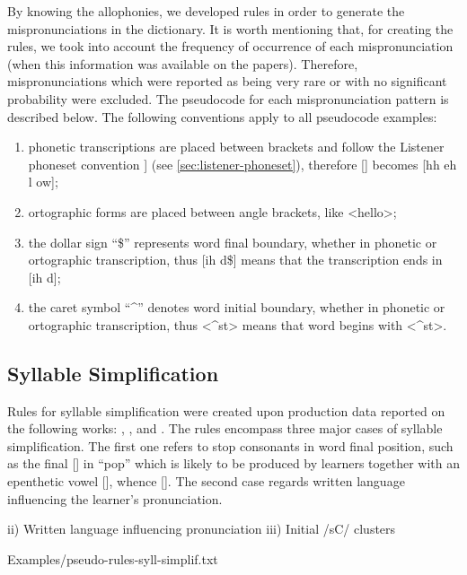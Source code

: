 By knowing the allophonies, we developed rules in order to generate the mispronunciations in the dictionary. It is worth mentioning that,
for creating the rules, we took into account the frequency of occurrence of each mispronunciation (when this information was available 
on the papers). Therefore, mispronunciations which were reported as being very rare or with no significant probability were excluded.
The pseudocode for each mispronunciation pattern is described below. The following conventions apply to all pseudocode examples:

\begin{enumerate}
 \item phonetic transcriptions are placed between brackets and follow the Listener phoneset convention ]
 (see \autoref{sec:listener-phoneset}), therefore [] becomes [hh eh l ow];
 \item ortographic forms are placed between angle brackets, like <hello>;
 \item the dollar sign ``\$'' represents word final boundary, whether in phonetic or ortographic transcription, thus [ih d\$] means that the transcription ends in [ih d];
 \item the caret symbol ``\textasciicircum'' denotes word initial boundary, whether in phonetic or ortographic transcription, thus <\textasciicircum st> means that word begins with <\textasciicircum st>.
\end{enumerate}

\subsection{Syllable Simplification}
Rules for syllable simplification were created upon production data reported on the following works:
\citeauthor{Cardoso2011} \citep{Cardoso2011}, \citeauthor{Silveira2012} \citep{Silveira2012}
\citeauthor{Rauber2004} \citep{Rauber2004}, and \citeauthor{Rebello2007} \citep{Rebello2007}. The rules
encompass three major cases of syllable simplification. The first one refers to stop consonants in word 
final position, such as the final [] in ``pop'' which is likely to be produced by learners
together with an epenthetic vowel [], whence []. The second case regards written language
influencing the learner's pronunciation. 

ii) Written language influencing pronunciation
iii) Initial /sC/ clusters 

%
    {Examples/pseudo-rules-syll-simplif.txt}

